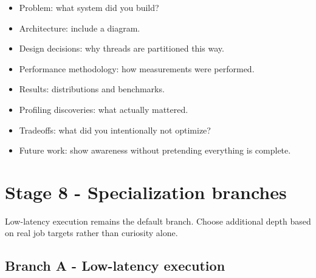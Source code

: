\documentclass[11pt,letterpaper]{article}
\begin{document}
\begin{itemize}

\item Problem: what system did you build?

\item Architecture: include a diagram.

\item Design decisions: why threads are partitioned this way.

\item Performance methodology: how measurements were performed.

\item Results: distributions and benchmarks.

\item Profiling discoveries: what actually mattered.

\item Tradeoffs: what did you intentionally not optimize?

\item Future work: show awareness without pretending everything is complete.

\end{itemize}

\section{Stage 8 - Specialization branches}\label{sec:12}

\label{stage:8}

Low-latency execution remains the default branch. Choose additional depth based on real job targets rather than curiosity alone.

\subsection*{Branch A - Low-latency execution}
\end{document}
